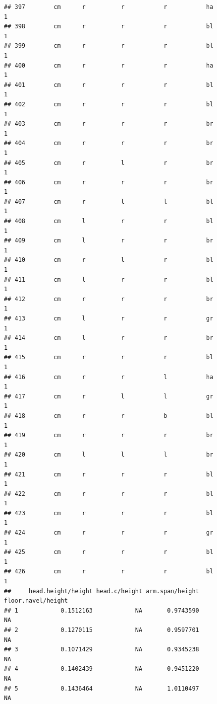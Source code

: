 \documentclass[]{article}
\begin{document}
\begin{verbatim}
## 397        cm      r          r           r           ha             1
## 398        cm      r          r           r           bl             1
## 399        cm      r          r           r           bl             1
## 400        cm      r          r           r           ha             1
## 401        cm      r          r           r           bl             1
## 402        cm      r          r           r           bl             1
## 403        cm      r          r           r           br             1
## 404        cm      r          r           r           br             1
## 405        cm      r          l           r           br             1
## 406        cm      r          r           r           br             1
## 407        cm      r          l           l           bl             1
## 408        cm      l          r           r           bl             1
## 409        cm      l          r           r           br             1
## 410        cm      r          l           r           bl             1
## 411        cm      l          r           r           bl             1
## 412        cm      r          r           r           br             1
## 413        cm      l          r           r           gr             1
## 414        cm      l          r           r           br             1
## 415        cm      r          r           r           bl             1
## 416        cm      r          r           l           ha             1
## 417        cm      r          l           l           gr             1
## 418        cm      r          r           b           bl             1
## 419        cm      r          r           r           br             1
## 420        cm      l          l           l           br             1
## 421        cm      r          r           r           bl             1
## 422        cm      r          r           r           bl             1
## 423        cm      r          r           r           bl             1
## 424        cm      r          r           r           gr             1
## 425        cm      r          r           r           bl             1
## 426        cm      r          r           r           bl             1
##     head.height/height head.c/height arm.span/height floor.navel/height
## 1            0.1512163            NA       0.9743590                 NA
## 2            0.1270115            NA       0.9597701                 NA
## 3            0.1071429            NA       0.9345238                 NA
## 4            0.1402439            NA       0.9451220                 NA
## 5            0.1436464            NA       1.0110497                 NA

\end{verbatim}
\end{document}

